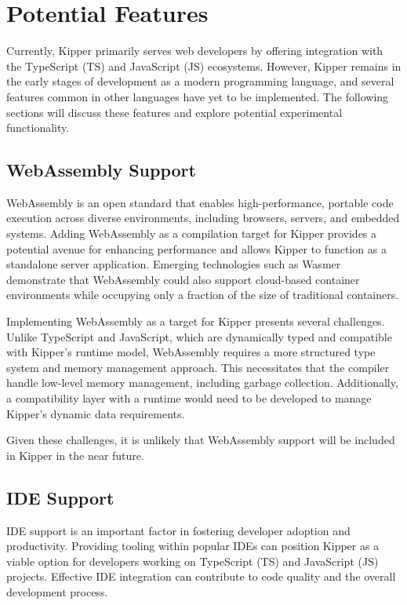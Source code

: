 \section{Potential Features}
\label{sec:future}

Currently, Kipper primarily serves web developers by offering integration with the TypeScript (TS) and JavaScript (JS) ecosystems. However, Kipper remains in the early stages of development as a modern programming language, and several features common in other languages have yet to be implemented. The following sections will discuss these features and explore potential experimental functionality.

\subsection{WebAssembly Support}

WebAssembly is an open standard that enables high-performance, portable code execution across diverse environments, including browsers, servers, and embedded systems. Adding WebAssembly as a compilation target for Kipper provides a potential avenue for enhancing performance and allows Kipper to function as a standalone server application. Emerging technologies such as Wasmer demonstrate that WebAssembly could also support cloud-based container environments while occupying only a fraction of the size of traditional containers.

Implementing WebAssembly as a target for Kipper presents several challenges. Unlike TypeScript and JavaScript, which are dynamically typed and compatible with Kipper’s runtime model, WebAssembly requires a more structured type system and memory management approach. This necessitates that the compiler handle low-level memory management, including garbage collection. Additionally, a compatibility layer with a runtime would need to be developed to manage Kipper’s dynamic data requirements.

Given these challenges, it is unlikely that WebAssembly support will be included in Kipper in the near future.

\subsection{IDE Support}

IDE support is an important factor in fostering developer adoption and productivity. Providing tooling within popular IDEs can position Kipper as a viable option for developers working on TypeScript (TS) and JavaScript (JS) projects. Effective IDE integration can contribute to code quality and the overall development process.

